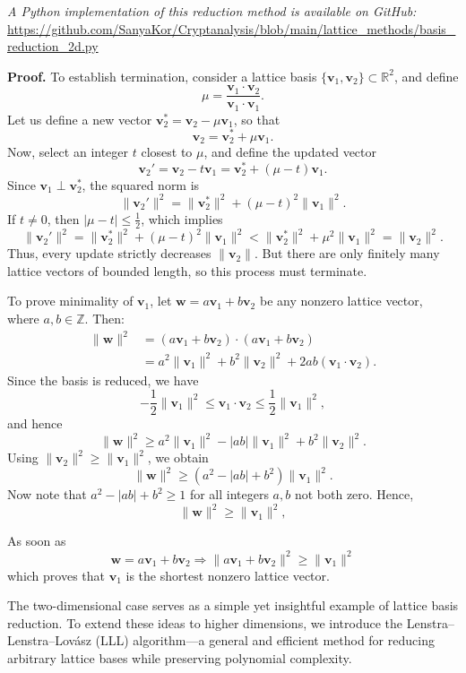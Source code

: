 \documentclass[a4paper,12pt]{article}
\begin{document}
\textit{A Python implementation of this reduction method is available on GitHub:}  
\url{https://github.com/SanyaKor/Cryptanalysis/blob/main/lattice\_methods/basis\_reduction\_2d.py}

\textbf{Proof.}
To establish termination, consider a lattice basis \( \{ \bm{v}_1, \bm{v}_2 \} \subset \mathbb{R}^2 \), and define
\[
\mu = \frac{ \bm{v}_1 \cdot \bm{v}_2 }{ \bm{v}_1 \cdot \bm{v}_1 }.
\]
Let us define a new vector \( \bm{v}_2^* = \bm{v}_2 - \mu \bm{v}_1 \), so that
\[
\bm{v}_2 = \bm{v}_2^* + \mu \bm{v}_1.
\]
Now, select an integer \( t \) closest to \( \mu \), and define the updated vector
\[
\bm{v}_2' = \bm{v}_2 - t \bm{v}_1 = \bm{v}_2^* + (\mu - t)\bm{v}_1.
\]
Since \( \bm{v}_1 \perp \bm{v}_2^* \), the squared norm is
\[
\| \bm{v}_2' \|^2 = \| \bm{v}_2^* \|^2 + (\mu - t)^2 \| \bm{v}_1 \|^2.
\]
If \( t \neq 0 \), then \( | \mu - t | \leq \frac{1}{2} \), which implies
\[
\| \bm{v}_2' \|^2 = \| \bm{v}_2^* \|^2 + (\mu - t)^2 \| \bm{v}_1 \|^2 < \| \bm{v}_2^* \|^2 + \mu^2 \| \bm{v}_1 \|^2 = \| \bm{v}_2 \|^2.
\]
Thus, every update strictly decreases \( \| \bm{v}_2 \| \). But there are only finitely many lattice vectors of bounded length, so this process must terminate.

\vspace{0.5em}
To prove minimality of \( \bm{v}_1 \), let \( \bm{w} = a \bm{v}_1 + b \bm{v}_2 \) be any nonzero lattice vector, where \( a, b \in \mathbb{Z} \). Then:
\begin{align*}
\| \bm{w} \|^2 &= (a \bm{v}_1 + b \bm{v}_2) \cdot (a \bm{v}_1 + b \bm{v}_2) \\
&= a^2 \| \bm{v}_1 \|^2 + b^2 \| \bm{v}_2 \|^2 + 2ab (\bm{v}_1 \cdot \bm{v}_2).
\end{align*}
Since the basis is reduced, we have
\[
- \frac{1}{2} \| \bm{v}_1 \|^2 \leq \bm{v}_1 \cdot \bm{v}_2 \leq \frac{1}{2} \| \bm{v}_1 \|^2,
\]
and hence
\[
\| \bm{w} \|^2 \geq a^2 \| \bm{v}_1 \|^2 - |ab| \| \bm{v}_1 \|^2 + b^2 \| \bm{v}_2 \|^2.
\]
Using \( \| \bm{v}_2 \|^2 \geq \| \bm{v}_1 \|^2 \), we obtain
\[
\| \bm{w} \|^2 \geq (a^2 - |ab| + b^2) \| \bm{v}_1 \|^2.
\]
Now note that \( a^2 - |ab| + b^2 \geq 1 \) for all integers \( a, b \) not both zero. Hence,
\[
\| \bm{w} \|^2 \geq \| \bm{v}_1 \|^2,
\]

As soon as
\[
	 \bm{w} = a \bm{v}_1 + b \bm{v}_2 \Rightarrow \|  a \bm{v}_1 + b \bm{v}_2 \| ^2 \geq \| \bm{v}_1 \|^2
\]
which proves that \( \bm{v}_1 \) is the shortest nonzero lattice vector.

The two-dimensional case serves as a simple yet insightful example of lattice basis reduction. To extend these ideas to higher dimensions, we introduce the Lenstra–Lenstra–Lovász (LLL) algorithm—a general and efficient method for reducing arbitrary lattice bases while preserving polynomial complexity.
\end{document}
